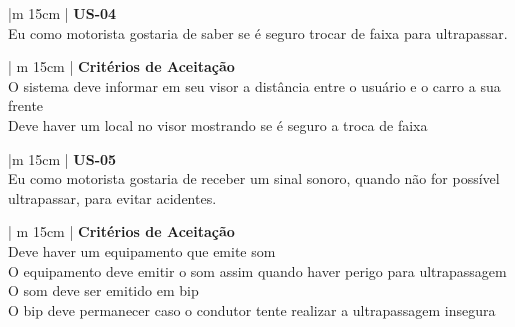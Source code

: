 \begin{table}[ht]
\caption{User Store - 04}
\centering
\begin{tabular}{|m {15cm} |}
\hline
\textbf{US-04} \\
\hline
Eu como motorista gostaria de saber se é seguro trocar de faixa para ultrapassar. \\
\hline
\end{tabular}
\label{table:us03}
\end{table}

\begin{table}[ht]
\caption{Critérios de Aceitaração para User Store - 04}
\centering
\begin{tabular}{| m {15cm} |}
\hline
\textbf{Critérios de Aceitação} \\
\hline
O sistema deve informar em seu visor a distância entre o usuário e o carro a sua frente\\
\hline
Deve haver um local no visor mostrando se é seguro a troca de faixa \\
\hline
\end{tabular}
\label{table:cus01}
\end{table}


\begin{table}[ht]
\caption{User Store - 05}
\centering
\begin{tabular}{|m {15cm} |}
\hline
\textbf{US-05} \\
\hline
Eu como motorista gostaria de receber um sinal sonoro, quando não for possível ultrapassar, para evitar acidentes. \\
\hline
\end{tabular}
\label{table:us03}
\end{table}

\begin{table}[ht]
\caption{Critérios de Aceitaração para User Store - 05}
\centering
\begin{tabular}{| m {15cm} |}
\hline
\textbf{Critérios de Aceitação} \\
\hline
Deve haver um equipamento que emite som\\
\hline
O equipamento deve emitir o som assim quando haver perigo para ultrapassagem \\
\hline
O som deve ser emitido em bip  \\
\hline
O bip deve permanecer caso o condutor tente realizar a ultrapassagem insegura \\
\hline
\end{tabular}
\label{table:cus01}
\end{table}


